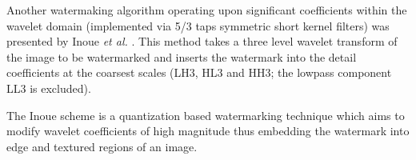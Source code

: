 \documentclass[10pt,twocolumn]{article}
\begin{document}
Another watermaking algorithm operating upon significant coefficients within the wavelet domain (implemented via 5/3 taps
symmetric short kernel filters) was presented by Inoue \emph{et al.} \cite{inoue}.
This method takes a three level wavelet transform
of the image to be watermarked and
inserts the watermark into the 
detail coefficients at the coarsest scales (LH3, HL3 and HH3; the lowpass component LL3 is excluded).

The Inoue scheme is a quantization based watermarking technique which aims to modify 
wavelet coefficients of high magnitude thus embedding the watermark into 
edge and textured regions of an image. 
%	
%	
%
%
%
\end{document}
